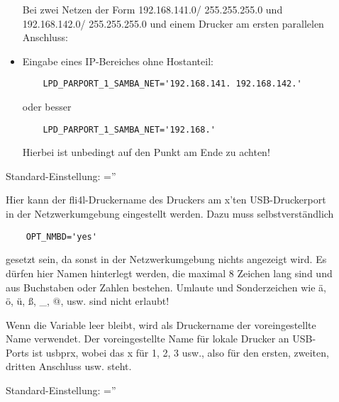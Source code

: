 \begin{description}
\begin{itemize}
    Bei zwei Netzen der Form 192.168.141.0/ 255.255.255.0 und
    192.168.142.0/ 255.255.255.0 und einem Drucker am ersten parallelen
    Anschluss:

\item  Eingabe eines IP-Bereiches ohne Hostanteil:

\begin{example}
\begin{verbatim}
    LPD_PARPORT_1_SAMBA_NET='192.168.141. 192.168.142.'
\end{verbatim}
\end{example}

    oder besser

\begin{example}
\begin{verbatim}
    LPD_PARPORT_1_SAMBA_NET='192.168.'
\end{verbatim}
\end{example}

    Hierbei ist unbedingt auf den Punkt am Ende zu achten!
\end{itemize}

    Standard-Einstellung: =''



    Hier kann der fli4l-Druckername des Druckers am x'ten USB-Druckerport in der
    Netzwerkumgebung eingestellt werden. Dazu muss selbstverständlich

\begin{example}
\begin{verbatim}
    OPT_NMBD='yes'
\end{verbatim}
\end{example}

    gesetzt sein, da sonst in der Netzwerkumgebung nichts angezeigt wird.
    Es dürfen hier Namen hinterlegt werden, die maximal 8 Zeichen lang sind und
    aus Buchstaben oder Zahlen bestehen. Umlaute und Sonderzeichen wie ä, ö, ü,
    ß, \_, @, usw. sind nicht erlaubt!

    Wenn die Variable leer bleibt, wird als Druckername der voreingestellte Name
    verwendet. Der voreingestellte Name für lokale Drucker an USB-Ports ist
    usbprx, wobei das x für 1, 2, 3 usw., also für den ersten, zweiten, dritten
    Anschluss usw. steht.

    Standard-Einstellung: =''



\end{description}
